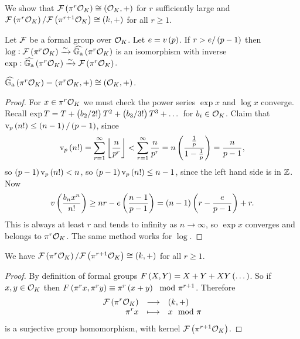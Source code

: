 \pagebreak

We show that $ \FFF\br{\pi^r\OOO_K} \cong \br{\OOO_K, +} $ for $ r $ sufficiently large and $ \FFF\br{\pi^r\OOO_K} / \FFF\br{\pi^{r + 1}\OOO_K} \cong \br{k, +} $ for all $ r \ge 1 $.


\begin{theorem}
\label{thm:9.2}
Let $ \mathcal{F} $ be a formal group over $ \mathcal{O}_K $. Let $ e = v\br{p} $. If $ r > e / \br{p - 1} $ then $ \log : \FFF\br{\pi^r\OOO_K} \xrightarrow{\sim} \widehat{\GG_\a}\br{\pi^r\OOO_K} $ is an isomorphism with inverse $ \exp : \widehat{\GG_\a}\br{\pi^r\OOO_K} \xrightarrow{\sim} \FFF\br{\pi^r\OOO_K} $.
\end{theorem}

\begin{remark*}
$ \widehat{\GG_\a}\br{\pi^r\OOO_K} = \br{\pi^r\OOO_K, +} \cong \br{\OOO_K, +} $.
\end{remark*}

\begin{proof}
For $ x \in \pi^r\mathcal{O}_K $ we must check the power series $ \exp x $ and $ \log x $ converge. Recall $ \exp T = T + \br{b_2 / 2!}T^2 + \br{b_3 / 3!}T^3 + \dots $ for $ b_i \in \mathcal{O}_K $. Claim that $ \v_p\br{n!} \le \br{n - 1} / \br{p - 1} $, since
$$ \v_p\br{n!} = \sum_{r = 1}^\infty \fbr{\dfrac{n}{p^r}} < \sum_{r = 1}^\infty \dfrac{n}{p^r} = n\br{\dfrac{\tfrac{1}{p}}{1 - \tfrac{1}{p}}} = \dfrac{n}{p - 1}, $$
so $ \br{p - 1}\v_p\br{n!} < n $, so $ \br{p - 1}\v_p\br{n!} \le n - 1 $, since the left hand side is in $ \mathbb{Z} $. Now
$$ v\br{\dfrac{b_nx^n}{n!}} \ge nr - e\br{\dfrac{n - 1}{p - 1}} = \br{n - 1}\br{r - \dfrac{e}{p - 1}} + r. $$
This is always at least $ r $ and tends to infinity as $ n \to \infty $, so $ \exp x $ converges and belongs to $ \pi^r\mathcal{O}_K $. The same method works for $ \log $.
\end{proof}

\begin{lemma}
We have $ \FFF\br{\pi^r\OOO_K} / \FFF\br{\pi^{r + 1}\OOO_K} \cong \br{k, +} $ for all $ r \ge 1 $.
\end{lemma}

\begin{proof}
By definition of formal groups $ F\br{X, Y} = X + Y + XY\br{\dots} $. So if $ x, y \in \mathcal{O}_K $ then $ F\br{\pi^rx, \pi^ry} \equiv \pi^r\br{x + y} \mod \pi^{r + 1} $. Therefore
$$ \function{\FFF\br{\pi^r\OOO_K}}{\br{k, +}}{\pi^rx}{x \mod \pi} $$
is a surjective group homomorphism, with kernel $ \FFF\br{\pi^{r + 1}\OOO_K} $.
\end{proof}

